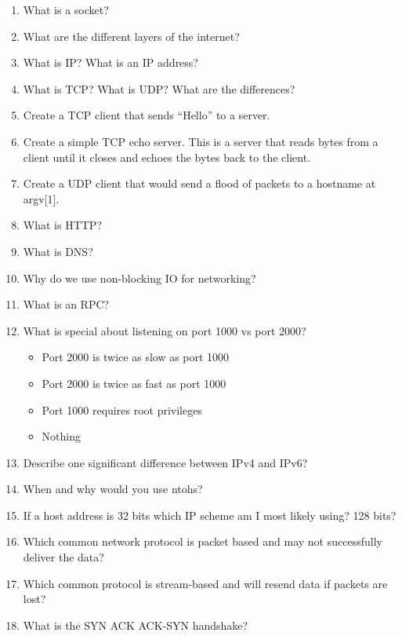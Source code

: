 \begin{enumerate}

\item What is a socket?
\item What are the different layers of the internet?
\item What is IP? What is an IP address?
\item What is TCP? What is UDP? What are the differences?
\item Create a TCP client that sends ``Hello'' to a server.
\item Create a simple TCP echo server. This is a server that reads bytes from a client until it closes and echoes the bytes back to the client.
\item Create a UDP client that would send a flood of packets to a hostname at argv[1].
\item What is HTTP?
\item What is DNS?
\item Why do we use non-blocking IO for networking?
\item What is an RPC?
\item What is special about listening on port 1000 vs port 2000?

\begin{itemize}
\tightlist
\item
  Port 2000 is twice as slow as port 1000
\item
  Port 2000 is twice as fast as port 1000
\item
  Port 1000 requires root privileges
\item
  Nothing
\end{itemize}

\item Describe one significant difference between IPv4 and IPv6?

\item When and why would you use ntohs?

\item If a host address is 32 bits which IP scheme am I most likely using? 128 bits?

\item Which common network protocol is packet based and may not successfully deliver the data?

\item Which common protocol is stream-based and will resend data if packets are lost?

\item What is the SYN ACK ACK-SYN handshake?


\end{enumerate}
